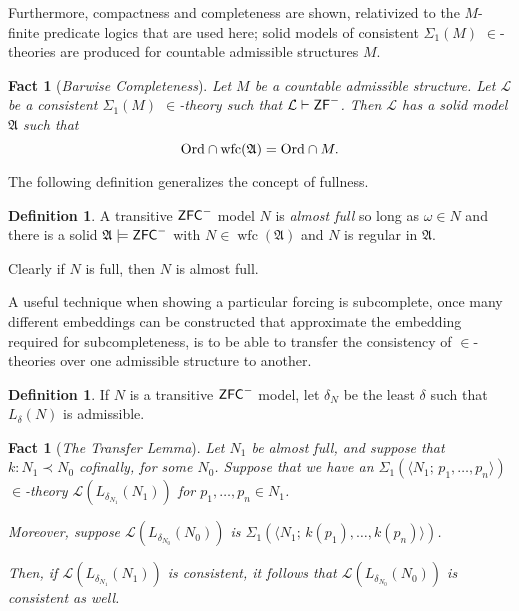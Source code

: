 \documentclass{amsart}
\newtheorem{fact}[theorem]{Fact}
\theoremstyle{definition}
\newtheorem{definition}[theorem]{Definition}
\theoremstyle{remark}
\newcommand{\ZFC}{\textup{\ensuremath{\textsf{ZFC}}}}
\newcommand{\Ord}{\textup{\ensuremath{\text{Ord}}}}
\DeclareMathOperator{\wfc}{wfc}
\begin{document}
Furthermore, compactness and completeness are shown, relativized to the $M$-finite predicate logics that are used here; solid models of consistent $\Sigma_1(M)$ $\in$-theories are produced for countable admissible structures $M$. 

\begin{fact}[\emph{Barwise Completeness}] \label{fact:completeness} Let $M$ be a countable admissible structure. Let $\mathcal L$ be a consistent $\Sigma_1(M)$ $\in$-theory such that $\mathcal L \vdash \textsf{\textup{ZF}}^-$. Then $\mathcal L$ has a solid model $\mathfrak A$ such that $$\Ord \cap \wfc(\mathfrak A) = \Ord \cap M.$$ \end{fact}


The following definition generalizes the concept of fullness.
\begin{definition} A transitive $\ZFC^-$ model $N$ is \emph{almost full} so long as $\omega \in N$ and there is a solid $\mathfrak A \models \ZFC^-$ with $N \in \wfc(\mathfrak A)$ and $N$ is regular in $\mathfrak A$. \end{definition}
Clearly if $N$ is full, then $N$ is almost full.

A useful technique when showing a particular forcing is subcomplete, once many different embeddings can be constructed that approximate the embedding required for subcompleteness, is to be able to transfer the consistency of $\in$-theories over one admissible structure to another. 
\begin{definition} If $N$ is a transitive $\ZFC^-$ model, let $\delta_N$ be the least $\delta$ such that $L_\delta(N)$ is admissible. \end{definition}

\begin{fact}[\emph{The Transfer Lemma}]\label{fact:Transfer} Let $N_1$ be almost full, and suppose that $k: N_1 \prec N_0$ cofinally, for some $N_0$. Suppose that we have an $\Sigma_1(\langle N_1; \, p_1, \dots, p_n\rangle)$  $\in$-theory $\mathcal L(L_{\delta_{N_1}}(N_1))$ for $p_1, \dots, p_n \in N_1$.

Moreover, suppose $\mathcal L(L_{\delta_{N_0}}(N_0))$ is $\Sigma_1(\langle N_1; \, k(p_1), \dots, k(p_n)\rangle)$. 

Then, 
if $\mathcal L(L_{\delta_{N_1}}(N_1))$ is consistent, it follows that $\mathcal L(L_{\delta_{N_0}}(N_0))$ is consistent as well. \end{fact} 
\end{document}
